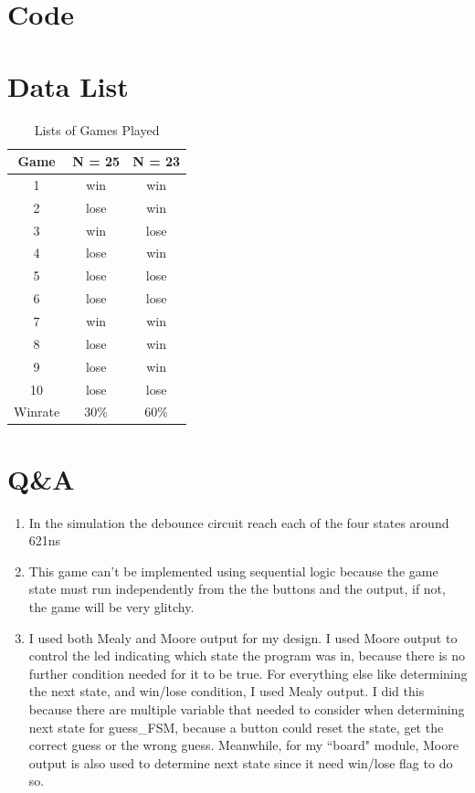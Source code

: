 \documentclass[11pt]{article}
\newcommand{\Verilog}[2][]{%
	
}
\begin{document}
\section*{Code}
\Verilog[firstline=23,caption=debounce Test Bench]{../verilog_code/debounce_test.sv}
\Verilog[firstline=23,caption=guess\_FSM Implementation]{../verilog_code/guess_FSM.sv}
\Verilog[firstline=23,caption=guess\_FSM Test Bench]{../verilog_code/test_guess_FSM.sv}
\Verilog[firstline=23,caption=guessing\_game Implementation]{../verilog_code/guessing_game.sv}
\Verilog[firstline=23,caption=guessing\_game Test Bench]{../verilog_code/test_guessing_game.sv}


\section*{Data List}
\begin{table}[ht]\centering
	\caption{Lists of Games Played}
	\begin{tabular}{c|c|c}
		Game & N = 25 & N = 23 \\
		\midrule
		1  & win  & win  \\
		2  & lose & win  \\
		3  & win  & lose \\		
		4  & lose & win  \\
		5  & lose & lose \\
		6  & lose & lose \\
		7  & win  & win  \\
		8  & lose & win  \\
		9  & lose & win  \\
		10 & lose & lose \\
		\midrule
		Winrate & 30\% & 60\% \\
		\bottomrule
	\end{tabular}
\end{table}

\section*{Q\&A}
\begin{enumerate}
	\item In the simulation the debounce circuit reach each of the four states around 621ns
	\item This game can't be implemented using sequential logic because the game state must run independently from the the buttons and the output, if not, the game will be very glitchy.
	\item I used both Mealy and Moore output for my design. I used Moore output to control the led indicating which state the program was in, because there is no further condition needed for it to be true. For everything else like determining the next state, and win/lose condition, I used Mealy output. I did this because there are multiple variable that needed to consider when determining next state for guess\_FSM, because a button could reset the state, get the correct guess or the wrong guess. Meanwhile, for my ``board" module, Moore output is also used to determine next state since it need win/lose flag to do so.
\end{enumerate} 
\end{document}
